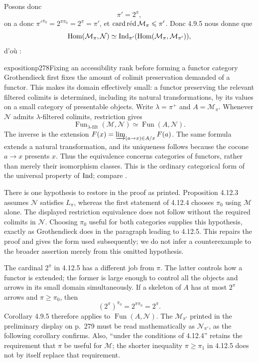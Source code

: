 Posons donc
\[
\pi' = 2^\pi ,
\]
on a donc $\pi'^{\pi_0} = 2^{\pi\pi_0} = 2^\pi = \pi'$, et $\card\red\M_\pi \leqslant \pi'$. Donc 4.9.5 nous donne que
\[
\Hom(\M_\pi,\N) \simeq \Ind_{\pi'}(\Hom(\M_\pi,\M_{\pi'})) , %
\]
d'où :

\begin{dcomment}{exposition}{p278}{Fixing an accessibility rank before forming a functor category}
Grothendieck first fixes the amount of colimit preservation demanded of a functor. This makes its domain effectively small: a functor preserving the relevant filtered colimits is determined, including its natural transformations, by its values on a small category of presentable objects. Write $\lambda=\pi^+$ and $A=\mathcal M_\pi$. Whenever $\mathcal N$ admits $\lambda$-filtered colimits, restriction gives
\[
 \operatorname{Fun}_{\lambda\text{-filt}}(\mathcal M,\mathcal N)
 \simeq \operatorname{Fun}(A,\mathcal N).
\]
The inverse is the extension $F(x)=\varinjlim_{(a\to x)\in A/x}F(a)$. The same formula extends a natural transformation, and its uniqueness follows because the cocone $a\to x$ presents $x$. Thus the equivalence concerns categories of functors, rather than merely their isomorphism classes. This is the ordinary categorical form of the universal property of $\Ind$; compare \citet[Remark 2.3(1)]{ChornyRosicky2012}.

There is one hypothesis to restore in the proof as printed. Proposition 4.12.3 assumes $\mathcal N$ satisfies $L_\pi$, whereas the first statement of 4.12.4 chooses $\pi_0$ using $\mathcal M$ alone. The displayed restriction equivalence does not follow without the required colimits in $\mathcal N$. Choosing $\pi_0$ useful for both categories supplies this hypothesis, exactly as Grothendieck does in the paragraph leading to 4.12.5. This repairs the proof and gives the form used subsequently; we do not infer a counterexample to the broader assertion merely from this omitted hypothesis.

The cardinal $2^\pi$ in 4.12.5 has a different job from $\pi$. The latter controls how a functor is extended; the former is large enough to control all the objects and arrows in its small domain simultaneously. If a skeleton of $A$ has at most $2^\pi$ arrows and $\pi\geq\pi_0$, then
\[
 (2^\pi)^{\pi_0}=2^{\pi\pi_0}=2^\pi.
\]
Corollary 4.9.5 therefore applies to $\operatorname{Fun}(A,\mathcal N)$. The $\mathcal M_{\pi'}$ printed in the preliminary display on p.~279 must be read mathematically as $\mathcal N_{\pi'}$, as the following corollary confirms. Also, ``under the conditions of 4.12.4'' retains the requirement that $\pi$ be useful for $\mathcal M$; the shorter inequality $\pi\geq\pi_1$ in 4.12.5 does not by itself replace that requirement.
\end{dcomment}


